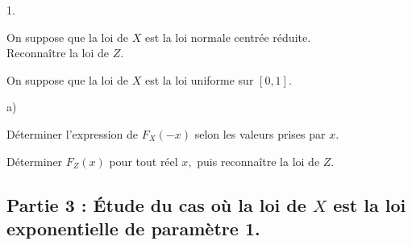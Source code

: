 \documentclass[11pt]{article}%
\begin{document}
\begin{noliste}{1.}
 \setlength{\itemsep}{4mm}
\item On suppose que la loi de $X$ est la loi normale centrée
réduite.\\
Reconnaître la loi de $Z.$

\item On suppose que la loi de $X$ est la loi uniforme sur $[0,1].$

\begin{noliste}{a)}
 \setlength{\itemsep}{2mm}
\item Déterminer l'expression de $F_{X}(-x)$ selon les valeurs prises
par $x.$

\item Déterminer $F_{Z}(x)$ pour tout réel $x,$ puis reconnaître la loi
de
$Z.$
\end{noliste}
\end{noliste}

\subsection*{Partie 3 : Étude du cas où la loi de $X$ est la loi
exponentielle
de paramètre 1.}
\end{document}
